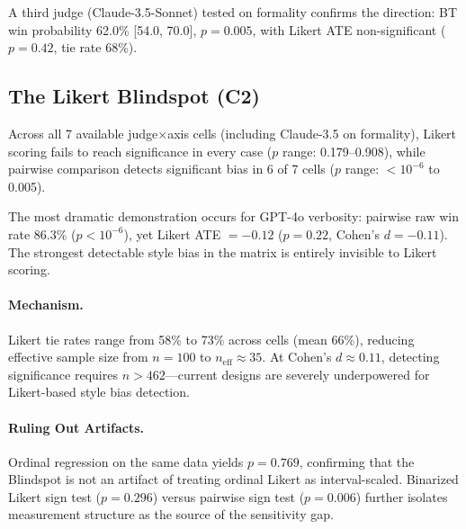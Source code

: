 \documentclass[11pt,a4paper]{article}
\begin{document}
A third judge (Claude-3.5-Sonnet) tested on formality confirms the direction: BT win probability 62.0\% [54.0, 70.0], $p=0.005$, with Likert ATE non-significant ($p=0.42$, tie rate 68\%).

\subsection{The Likert Blindspot (C2)}

Across all 7 available judge$\times$axis cells (including Claude-3.5 on formality), Likert scoring fails to reach significance in every case ($p$ range: 0.179--0.908), while pairwise comparison detects significant bias in 6 of 7 cells ($p$ range: $<10^{-6}$ to 0.005).

The most dramatic demonstration occurs for GPT-4o verbosity: pairwise raw win rate 86.3\% ($p < 10^{-6}$), yet Likert ATE $= -0.12$ ($p = 0.22$, Cohen's $d = -0.11$). The strongest detectable style bias in the matrix is entirely invisible to Likert scoring.

\paragraph{Mechanism.} Likert tie rates range from 58\% to 73\% across cells (mean 66\%), reducing effective sample size from $n=100$ to $n_{\text{eff}} \approx 35$. At Cohen's $d \approx 0.11$, detecting significance requires $n > 462$---current designs are severely underpowered for Likert-based style bias detection.

\paragraph{Ruling Out Artifacts.} Ordinal regression on the same data yields $p=0.769$, confirming that the Blindspot is not an artifact of treating ordinal Likert as interval-scaled. Binarized Likert sign test ($p=0.296$) versus pairwise sign test ($p=0.006$) further isolates measurement structure as the source of the sensitivity gap.
\end{document}
